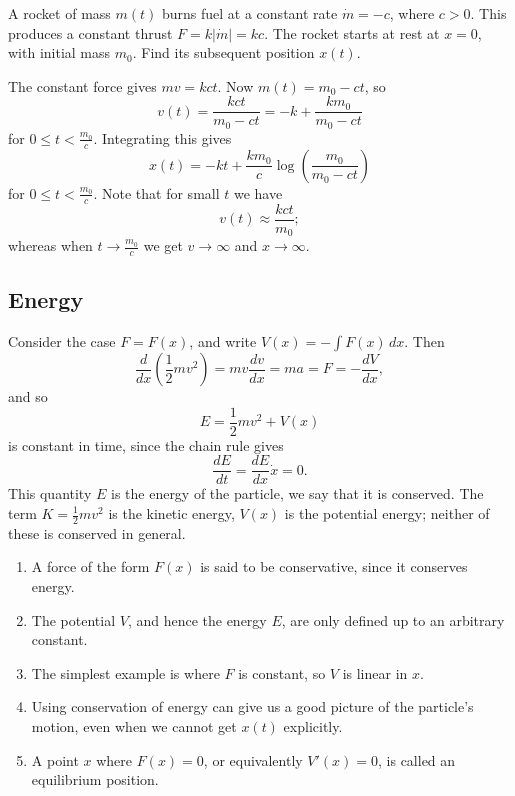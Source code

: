 \documentclass[10pt, a4paper]{article}
\begin{document}
\begin{example}
    A rocket of mass $m(t)$ burns fuel at a constant rate $\dot{m} = -c$,
    where $c > 0$.
    This produces a constant thrust $F = k|\dot{m}| = kc$.
    The rocket starts at rest at $x = 0$,
    with initial mass $m_0$.
    Find its subsequent position $x(t)$.
    \begin{solution}
        The constant force gives $mv = kct$.
        Now $m(t) = m_0 - ct$,
        so
        \[
        v(t) = \frac{kct}{m_0 - ct} = -k + \frac{km_0}{m_0 - ct}
        \]
        for $0 \leq t < \frac{m_0}{c}$.
        Integrating this gives
        \[
        x(t) = -kt + \frac{km_0}{c}\log\left(\frac{m_0}{m_0 - ct}\right)
        \]
        for $0 \leq t < \frac{m_0}{c}$.
        Note that for small $t$ we have
        \[
        v(t) \approx \frac{kct}{m_0};
        \]
        whereas when $t \rightarrow \frac{m_0}{c}$ we get $v \rightarrow \infty$ and $x \rightarrow \infty$.
    \end{solution}
\end{example}

\subsection{Energy}

\begin{definition}
    Consider the case $F = F(x)$,
    and write $V(x) = -\int F(x)\,dx$.
    Then
    \[
    \frac{d}{dx}\left(\frac{1}{2}mv ^ 2\right) = mv\frac{dv}{dx} = ma = F = -\frac{dV}{dx},
    \]
    and so
    \[
    E = \frac{1}{2}mv ^ 2 + V(x)
    \]
    is constant in time,
    since the chain rule gives
    \[
    \frac{dE}{dt} = \frac{dE}{dx}\dot{x} = 0.
    \]
    This quantity $E$ is the energy of the particle,
    we say that it is conserved.
    The term $K = \frac{1}{2}mv ^ 2$ is the kinetic energy,
    $V(x)$ is the potential energy;
    neither of these is conserved in general.
\end{definition}

\begin{remark}
    \begin{enumerate}[label = (\roman*)]
        \item A force of the form $F(x)$ is said to be conservative,
        since it conserves energy.

        \item The potential $V$,
        and hence the energy $E$,
        are only defined up to an arbitrary constant.

        \item The simplest example is where $F$ is constant,
        so $V$ is linear in $x$.

        \item Using conservation of energy can give us a good picture of the particle's motion,
        even when we cannot get $x(t)$ explicitly.

        \item A point $x$ where $F(x) = 0$,
        or equivalently $V'(x) = 0$,
        is called an equilibrium position.
    \end{enumerate}
\end{remark}
\end{document}
